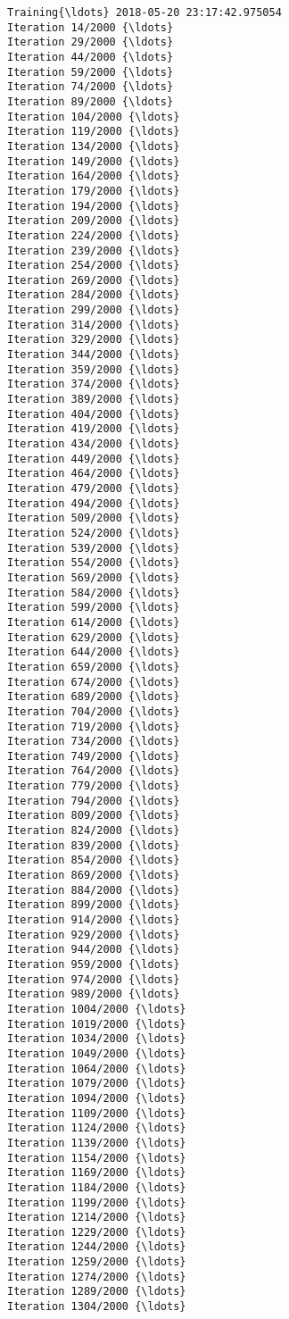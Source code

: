 \documentclass[11pt]{article}
\begin{document}
    \begin{Verbatim}[commandchars=\\\{\}]
Training{\ldots} 2018-05-20 23:17:42.975054
Iteration 14/2000 {\ldots}
Iteration 29/2000 {\ldots}
Iteration 44/2000 {\ldots}
Iteration 59/2000 {\ldots}
Iteration 74/2000 {\ldots}
Iteration 89/2000 {\ldots}
Iteration 104/2000 {\ldots}
Iteration 119/2000 {\ldots}
Iteration 134/2000 {\ldots}
Iteration 149/2000 {\ldots}
Iteration 164/2000 {\ldots}
Iteration 179/2000 {\ldots}
Iteration 194/2000 {\ldots}
Iteration 209/2000 {\ldots}
Iteration 224/2000 {\ldots}
Iteration 239/2000 {\ldots}
Iteration 254/2000 {\ldots}
Iteration 269/2000 {\ldots}
Iteration 284/2000 {\ldots}
Iteration 299/2000 {\ldots}
Iteration 314/2000 {\ldots}
Iteration 329/2000 {\ldots}
Iteration 344/2000 {\ldots}
Iteration 359/2000 {\ldots}
Iteration 374/2000 {\ldots}
Iteration 389/2000 {\ldots}
Iteration 404/2000 {\ldots}
Iteration 419/2000 {\ldots}
Iteration 434/2000 {\ldots}
Iteration 449/2000 {\ldots}
Iteration 464/2000 {\ldots}
Iteration 479/2000 {\ldots}
Iteration 494/2000 {\ldots}
Iteration 509/2000 {\ldots}
Iteration 524/2000 {\ldots}
Iteration 539/2000 {\ldots}
Iteration 554/2000 {\ldots}
Iteration 569/2000 {\ldots}
Iteration 584/2000 {\ldots}
Iteration 599/2000 {\ldots}
Iteration 614/2000 {\ldots}
Iteration 629/2000 {\ldots}
Iteration 644/2000 {\ldots}
Iteration 659/2000 {\ldots}
Iteration 674/2000 {\ldots}
Iteration 689/2000 {\ldots}
Iteration 704/2000 {\ldots}
Iteration 719/2000 {\ldots}
Iteration 734/2000 {\ldots}
Iteration 749/2000 {\ldots}
Iteration 764/2000 {\ldots}
Iteration 779/2000 {\ldots}
Iteration 794/2000 {\ldots}
Iteration 809/2000 {\ldots}
Iteration 824/2000 {\ldots}
Iteration 839/2000 {\ldots}
Iteration 854/2000 {\ldots}
Iteration 869/2000 {\ldots}
Iteration 884/2000 {\ldots}
Iteration 899/2000 {\ldots}
Iteration 914/2000 {\ldots}
Iteration 929/2000 {\ldots}
Iteration 944/2000 {\ldots}
Iteration 959/2000 {\ldots}
Iteration 974/2000 {\ldots}
Iteration 989/2000 {\ldots}
Iteration 1004/2000 {\ldots}
Iteration 1019/2000 {\ldots}
Iteration 1034/2000 {\ldots}
Iteration 1049/2000 {\ldots}
Iteration 1064/2000 {\ldots}
Iteration 1079/2000 {\ldots}
Iteration 1094/2000 {\ldots}
Iteration 1109/2000 {\ldots}
Iteration 1124/2000 {\ldots}
Iteration 1139/2000 {\ldots}
Iteration 1154/2000 {\ldots}
Iteration 1169/2000 {\ldots}
Iteration 1184/2000 {\ldots}
Iteration 1199/2000 {\ldots}
Iteration 1214/2000 {\ldots}
Iteration 1229/2000 {\ldots}
Iteration 1244/2000 {\ldots}
Iteration 1259/2000 {\ldots}
Iteration 1274/2000 {\ldots}
Iteration 1289/2000 {\ldots}
Iteration 1304/2000 {\ldots}

\end{Verbatim}
\end{document}
